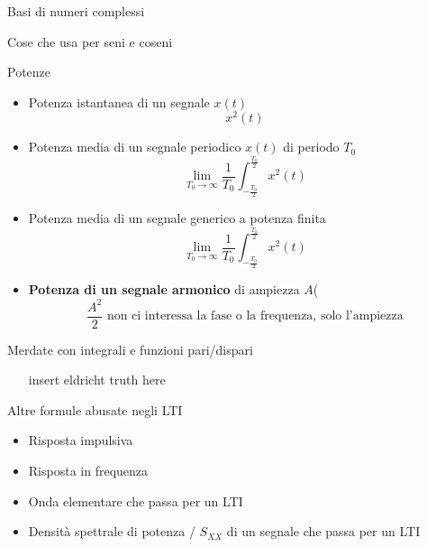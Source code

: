 \documentclass{article}
\begin{document}
Basi di numeri complessi

Cose che usa per seni e coseni

Potenze
\begin{itemize}
\item Potenza istantanea di un segnale $x(t)$ \begin{equation*}
  x^2(t)
\end{equation*} %
  
\item Potenza media di un segnale periodico $x(t)$ di periodo $T_0$\begin{equation*}
  \lim_{T_0 \to \infty} \frac{1}{T_0} \int_{- \frac{T_0}{2}}^{\frac{T_0}{2}} x^2(t)
\end{equation*}

\item Potenza media di un segnale generico a potenza finita \begin{equation*}
  \lim_{T_0 \to \infty} \frac{1}{T_0} \int_{- \frac{T_0}{2}}^{\frac{T_0}{2}} x^2(t)
\end{equation*}
  
\item \textbf{Potenza di un segnale armonico} di ampiezza $A$( \begin{equation*}
  \frac{A^2}{2} \text{ non ci interessa la fase o la frequenza, solo l'ampiezza}
\end{equation*}
\end{itemize}


Merdate con integrali e funzioni pari/dispari
\begin{itemize}
\item [insert eldricht truth here]
\end{itemize}

Altre formule abusate negli LTI
\begin{itemize}
\item Risposta impulsiva
\item Risposta in frequenza
\item Onda elementare che passa per un LTI
\item Densità spettrale di potenza / $S_{XX}$ di un segnale che passa per un LTI
\end{itemize}
\end{document}

